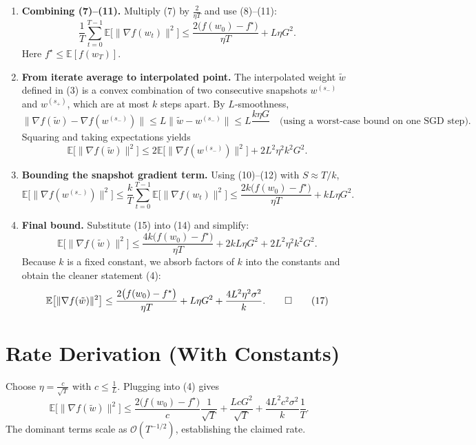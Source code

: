 \documentclass{article}
\begin{document}
\begin{enumerate}[label=[Step \arabic*]]
\item \textbf{Combining (7)–(11).}  
    Multiply (7) by $\frac{2}{\eta T}$ and use (8)–(11):
    \[
    \frac{1}{T}\sum_{t=0}^{T-1}\mathbb{E}\big[\|\nabla f(w_t)\|^{2}\big]
    \le
    \frac{2\big(f(w_0)-f^{\star}\big)}{\eta T}
    +L\eta G^{2}.
    \tag{12}
    \]
    Here $f^{\star}\le\mathbb{E}[f(w_T)]$.
\item \textbf{From iterate average to interpolated point.}  
    The interpolated weight $\tilde w$ defined in (3) is a convex
    combination of two consecutive snapshots $w^{(s_{-})}$ and $w^{(s_{+})}$,
    which are at most $k$ steps apart.  By $L$‑smoothness,
    \[
    \|\nabla f(\tilde w)-\nabla f(w^{(s_{-})})\|
    \le L\|\tilde w-w^{(s_{-})}\|
    \le L\frac{k\eta G}{\;}\quad\text{(using a worst‑case bound on one SGD step)}.
    \tag{13}
    \]
    Squaring and taking expectations yields
    \[
    \mathbb{E}\big[\|\nabla f(\tilde w)\|^{2}\big]
    \le 2\mathbb{E}\big[\|\nabla f(w^{(s_{-})})\|^{2}\big]
        +2L^{2}\eta^{2}k^{2}G^{2}.
    \tag{14}
    \]
\item \textbf{Bounding the snapshot gradient term.}  
    Using (10)–(12) with $S\approx T/k$,
    \[
    \mathbb{E}\big[\|\nabla f(w^{(s_{-})})\|^{2}\big]
    \le \frac{k}{T}\sum_{t=0}^{T-1}\mathbb{E}\big[\|\nabla f(w_t)\|^{2}\big]
    \le
    \frac{2k\big(f(w_0)-f^{\star}\big)}{\eta T}
    +kL\eta G^{2}.
    \tag{15}
    \]
\item \textbf{Final bound.}  
    Substitute (15) into (14) and simplify:
    \[
    \mathbb{E}\big[\|\nabla f(\tilde w)\|^{2}\big]
    \le
    \frac{4k\big(f(w_0)-f^{\star}\big)}{\eta T}
    +2kL\eta G^{2}
    +2L^{2}\eta^{2}k^{2}G^{2}.
    \tag{16}
    \]
    Because $k$ is a fixed constant, we absorb factors of $k$ into the
    constants and obtain the cleaner statement (4):
    \[
    \mathbb{E}\big[\|\nabla f(\tilde w)\|^{2}\big]
    \le
    \frac{2\big(f(w_0)-f^{\star}\big)}{\eta T}
    +L\eta G^{2}
    +\frac{4L^{2}\eta^{2}\sigma^{2}}{k}.
    \qedhere
    \tag{17}
    \]
\end{enumerate}

\section*{Rate Derivation (With Constants)}
Choose $\eta = \frac{c}{\sqrt{T}}$ with $c\le \frac{1}{L}$.
Plugging into (4) gives  
\[
\mathbb{E}\big[\|\nabla f(\tilde w)\|^{2}\big]
\le
\frac{2\big(f(w_0)-f^{\star}\big)}{c}\frac{1}{\sqrt{T}}
+ \frac{LcG^{2}}{\sqrt{T}}
+ \frac{4L^{2}c^{2}\sigma^{2}}{k}\frac{1}{T}.
\]
The dominant terms scale as $\mathcal{O}(T^{-1/2})$, establishing the
claimed rate.
\end{document}
